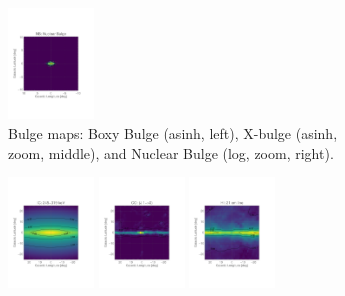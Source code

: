 \documentclass[doublespace,nopageskip]{VTthesis} %
\begin{document}
\begin{figure}
\begin{subfigure}[h]{1\textwidth}
		\includegraphics[width=0.25\textwidth,trim=0.44in 2.03in 1.29in 2.34in,clip=true]{Figures/511keV/map_NB_log_grid_20x20.pdf}
		\caption{Bulge maps: Boxy Bulge (asinh, left), X-bulge (asinh, zoom, middle), and Nuclear Bulge (log, zoom, right).}\label{fig:BB_map}\label{fig:XB_map}\label{fig:NB_map}
	\end{subfigure}
	\begin{subfigure}[h]{1\textwidth}
		\centering
		\includegraphics[width=0.25\textwidth,trim=0.44in 2.03in 1.29in 2.34in,clip=true]{Figures/511keV/map_IC0245-0319_asinh_grid.pdf}
		\includegraphics[width=0.25\textwidth,trim=0.44in 2.03in 1.29in 2.34in,clip=true]{Figures/511keV/map_CO_asinh_grid.pdf}
		\includegraphics[width=0.25\textwidth,trim=0.44in 2.03in 1.29in 2.34in,clip=true]{Figures/511keV/map_HI_asinh_grid.pdf}

\end{subfigure}
\end{figure}
\end{document}
